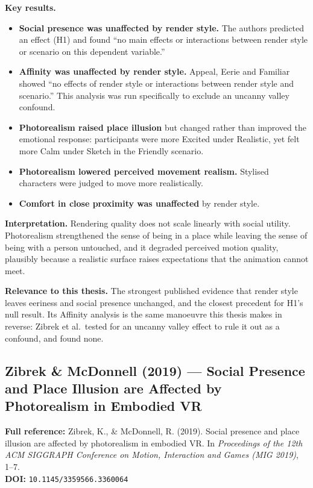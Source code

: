 \documentclass[11pt, a4paper]{article}
\begin{document}
\textbf{Key results.}
\begin{itemize}[leftmargin=2em]
  \item \textbf{Social presence was unaffected by render style.} The authors predicted an effect (H1) and found ``no main effects or interactions between render style or scenario on this dependent variable.''
  \item \textbf{Affinity was unaffected by render style.} Appeal, Eerie and Familiar showed ``no effects of render style or interactions between render style and scenario.'' This analysis was run specifically to exclude an uncanny valley confound.
  \item \textbf{Photorealism raised place illusion} but changed rather than improved the emotional response: participants were more Excited under Realistic, yet felt more Calm under Sketch in the Friendly scenario.
  \item \textbf{Photorealism lowered perceived movement realism.} Stylised characters were judged to move more realistically.
  \item \textbf{Comfort in close proximity was unaffected} by render style.
\end{itemize}

\textbf{Interpretation.} Rendering quality does not scale linearly with social utility. Photorealism strengthened the sense of being in a place while leaving the sense of being with a person untouched, and it degraded perceived motion quality, plausibly because a realistic surface raises expectations that the animation cannot meet.

\textbf{Relevance to this thesis.} The strongest published evidence that render style leaves eeriness and social presence unchanged, and the closest precedent for H1's null result. Its Affinity analysis is the same manoeuvre this thesis makes in reverse: Zibrek et al.\ tested for an uncanny valley effect to rule it out as a confound, and found none.

\vspace{8pt}
\subsection{Zibrek \& McDonnell (2019) --- Social Presence and Place Illusion are Affected by Photorealism in Embodied VR}

\begin{refbox}
\textbf{Full reference:} Zibrek, K., \& McDonnell, R. (2019). Social presence and place illusion are affected by photorealism in embodied VR. In \textit{Proceedings of the 12th ACM SIGGRAPH Conference on Motion, Interaction and Games (MIG 2019)}, 1--7.\\[4pt]
\textbf{DOI:} \texttt{10.1145/3359566.3360064}
\end{refbox}
\end{document}
